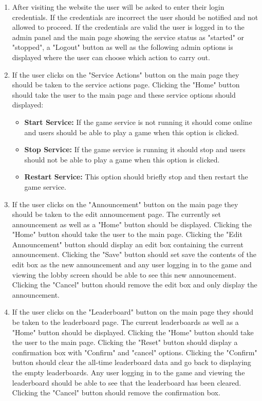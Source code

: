 \documentclass[titlepage]{article}
\begin{document}
\begin{enumerate}
	\item After visiting the website the user will be asked to enter their login credentials. If the credentials are incorrect the user should be notified and not allowed to proceed. If the credentials are valid the user is logged in to the admin panel and the main page showing the service status as "started" or "stopped", a "Logout" button as well as the following admin options is displayed where the user can choose which action to carry out.
	\item If the user clicks on the "Service Actions" button on the main page they should be taken to the service actions page. Clicking the "Home" button should take the user to the main page and these service options should displayed:
	      \begin{itemize}
		      \item \textbf{Start Service:} If the game service is not running it should come online and users should be able to play a game when this option is clicked.
		      \item \textbf{Stop Service:} If the game service is running it should stop and users should not be able to play a game when this option is clicked.
		      \item \textbf{Restart Service:} This option should briefly stop and then restart the game service.
	      \end{itemize}
	\item If the user clicks on the "Announcement" button on the main page  they should be taken to the edit announcement page.  The currently set announcement as well as a "Home" button should be displayed. Clicking the "Home" button should take the user to the main page. Clicking the "Edit Announcement" button should display an edit box containing the current announcement. Clicking the "Save" button should set save the contents of the edit box as the new announcement and any user logging in to the game and viewing the lobby screen should be able to see this new announcement. Clicking the "Cancel" button should remove the edit box and only display the announcement.
	\item If the user clicks on the "Leaderboard" button on the main page they should be taken to the leaderboard page. The current leaderboards as well as a "Home" button should be displayed. Clicking the "Home" button should take the user to the main page. Clicking the "Reset" button should display a confirmation box with "Confirm" and "cancel" options. Clicking the "Confirm" button should clear the all-time leaderboard data and go back to displaying the empty leaderboards.  Any user logging in to the game and viewing the leaderboard should be able to see that the leaderboard has been cleared. Clicking the "Cancel" button should remove the confirmation box.

\end{enumerate}
\end{document}
